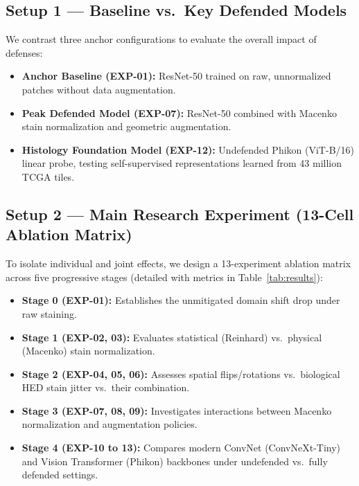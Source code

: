 \documentclass[11pt,a4paper]{article}
\begin{document}
\subsection{Setup 1 --- Baseline vs.\ Key Defended Models}
We contrast three anchor configurations to evaluate the overall impact of defenses:
\begin{itemize}[leftmargin=*,itemsep=1pt]
  \item \textbf{Anchor Baseline (EXP-01):} ResNet-50 trained on raw, unnormalized patches without data augmentation.
  \item \textbf{Peak Defended Model (EXP-07):} ResNet-50 combined with Macenko stain normalization and geometric augmentation.
  \item \textbf{Histology Foundation Model (EXP-12):} Undefended Phikon (ViT-B/16) linear probe, testing self-supervised representations learned from 43 million TCGA tiles.
\end{itemize}

\subsection{Setup 2 --- Main Research Experiment (13-Cell Ablation Matrix)}
To isolate individual and joint effects, we design a 13-experiment ablation matrix across five progressive stages (detailed with metrics in Table~\ref{tab:results}):
\begin{itemize}[leftmargin=*,itemsep=1pt]
  \item \textbf{Stage 0 (EXP-01):} Establishes the unmitigated domain shift drop under raw staining.
  \item \textbf{Stage 1 (EXP-02, 03):} Evaluates statistical (Reinhard) vs.\ physical (Macenko) stain normalization.
  \item \textbf{Stage 2 (EXP-04, 05, 06):} Assesses spatial flips/rotations vs.\ biological HED stain jitter vs.\ their combination.
  \item \textbf{Stage 3 (EXP-07, 08, 09):} Investigates interactions between Macenko normalization and augmentation policies.
  \item \textbf{Stage 4 (EXP-10 to 13):} Compares modern ConvNet (ConvNeXt-Tiny) and Vision Transformer (Phikon) backbones under undefended vs.\ fully defended settings.
\end{itemize}
\end{document}
